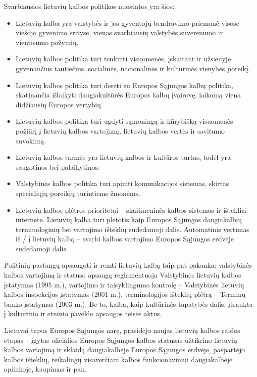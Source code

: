 \begin{multicols}{2}
    Svarbiausios lietuvių kalbos politikos nuostatos yra šios:   
  \begin{itemize}
      \item Lietuvių kalba yra valstybės ir jos gyventojų bendravimo priemonė visose viešojo gyvenimo srityse, vienas svarbiausių valstybės suverenumo ir vientisumo požymių.
      \item Lietuvių kalbos politika turi tenkinti visuomenės, įskaitant ir užsienyje gyvenančius tautiečius, socialinės, nacionalinės ir kultūrinės vienybės poreikį.
      \item Lietuvių kalbos politika turi derėti su Europos Sąjungos kalbų politika, skatinančia išlaikyti daugiakultūrės Europos kalbų įvairovę, laikomą viena didžiausių Europos vertybių.
      \item Lietuvių kalbos politika turi ugdyti sąmoningą ir kūrybišką visuomenės požiūrį į lietuvių kalbos vartojimą, lietuvių kalbos vertės ir savitumo suvokimą.
      \item Lietuvių kalbos tarmės yra lietuvių kalbos ir kultūros turtas, todėl yra saugotinos bei palaikytinos.
       \item Valstybinės kalbos politika turi apimti komunikacijos sistemas, skirtas specialiųjų poreikių turintiems žmonėms.
      \item Lietuvių kalbos plėtros prioritetai – skaitmeninės kalbos sistemos ir ištekliai internete. Lietuvių kalba turi plėtotis kaip Europos Sąjungos daugiakalbių terminologinių bei vartojimo išteklių sudedamoji dalis. Automatinis vertimas iš / į lietuvių kalbą – svarbi kalbos vartojimo Europos Sąjungos erdvėje sudedamoji dalis.
    \end{itemize}

    Politinių pastangų apsaugoti ir remti lietuvių kalbą taip pat pakanka: valstybinės kalbos vartojimą ir statuso apsaugą reglamentuoja Valstybinės lietuvių kalbos įstatymas (1995 m.), vartojimo ir taisyklingumo kontrolę – Valstybinės lietuvių kalbos inspekcijos įstatymas (2001 m.), terminologijos išteklių plėtrą – Terminų banko įstatymas (2003 m.). Be to, kalba, kaip kultūrinės tapatybės dalis, įtraukta į kultūrinio ir etninio paveldo apsaugos teisės aktus.   


 Lietuvai tapus Europos Sąjungos nare, prasidėjo naujas lietuvių kalbos raidos etapas – įgytas oficialios Europos Sąjungos kalbos statusas užtikrino lietuvių kalbos vartojimą ir sklaidą daugiakalbėje Europos Sąjungos erdvėje, paspartėjo kalbos išteklių, reikalingų visaverčiam kalbos funkcionavimui daugiakalbėje aplinkoje, kaupimas ir pan.   


\end{multicols}
